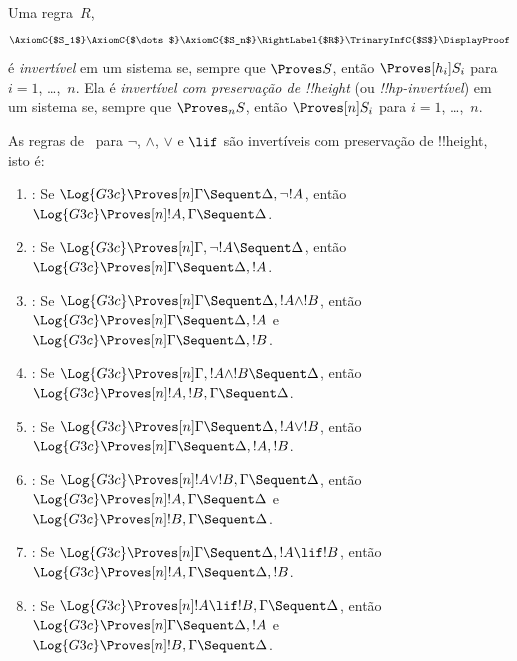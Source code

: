 \documentclass[../../../include/open-logic-section]{subfiles}
\begin{document}


\begin{defn}
Uma regra~$R$,
\[
\AxiomC{$S_1$}
\AxiomC{$\dots$}
\AxiomC{$S_n$}
\RightLabel{$R$}
\TrinaryInfC{$S$}
\DisplayProof
\]
é \emph{invertível} em um sistema se, sempre que $\Proves S$, então
$\Proves[h_i] S_i$ para $i = 1$, \dots,~$n$. Ela é
\emph{invertível com preservação de !!{height}} (ou \emph{!!{hp}-invertível})
em um sistema se, sempre que $\Proves_n S$, então $\Proves[n] S_i$ para $i =
1$, \dots,~$n$.
\end{defn}

\begin{lem}
As regras de~ para $\lnot$, $\land$, $\lor$ e $\lif$ são
invertíveis com preservação de !!{height}, isto é:
\begin{enumerate}
  \item \RightR{\lnot}: Se $\Log{G3c} \Proves[n] \Gamma \Sequent
  \Delta, \lnot !A$, então $\Log{G3c} \Proves[n] !A, \Gamma \Sequent
  \Delta$.
  \item \LeftR{\lnot}: Se $\Log{G3c} \Proves[n] \Gamma, \lnot !A
  \Sequent \Delta$, então $\Log{G3c} \Proves[n] \Gamma \Sequent \Delta,
  !A$.
  \item \RightR{\land}: Se $\Log{G3c} \Proves[n] \Gamma \Sequent
  \Delta, !A \land !B$, então $\Log{G3c} \Proves[n] \Gamma \Sequent
  \Delta, !A$ e $\Log{G3c} \Proves[n] \Gamma \Sequent
  \Delta, !B$.
  \item \LeftR{\land}: Se $\Log{G3c} \Proves[n] \Gamma, !A \land !B
  \Sequent \Delta$, então $\Log{G3c} \Proves[n] !A, !B, \Gamma \Sequent
  \Delta$.
  \item \RightR{\lor}: Se $\Log{G3c} \Proves[n] \Gamma \Sequent
  \Delta, !A \lor !B$, então $\Log{G3c} \Proves[n] \Gamma \Sequent
  \Delta, !A, !B$.
  \item \LeftR{\lor}: Se $\Log{G3c} \Proves[n] !A \lor !B, \Gamma \Sequent
  \Delta$, então $\Log{G3c} \Proves[n] !A, \Gamma \Sequent
  \Delta$ e $\Log{G3c} \Proves[n] !B, \Gamma \Sequent
  \Delta$.
  \item \RightR{\lif}: Se $\Log{G3c} \Proves[n] \Gamma \Sequent
  \Delta, !A \lif !B$, então $\Log{G3c} \Proves[n] !A, \Gamma \Sequent
  \Delta, !B$.
  \item \LeftR{\lif}: Se $\Log{G3c} \Proves[n] !A \lif !B, \Gamma
  \Sequent \Delta$, então $\Log{G3c} \Proves[n] \Gamma \Sequent \Delta,
  !A$ e $\Log{G3c} \Proves[n] !B, \Gamma \Sequent \Delta$.
\end{enumerate}
\end{lem}
\end{document}
